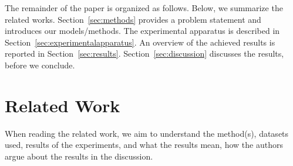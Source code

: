 \documentclass[sigconf, review, nonacm]{acmart}
\begin{document}
The remainder of the paper is organized as follows.
%
Below, we summarize the related works.
Section~\ref{sec:methods} provides a problem statement and introduces our models/methods.
The experimental apparatus is described in Section~\ref{sec:experimentalapparatus}.
An overview of the achieved results is reported in Section~\ref{sec:results}. 
Section~\ref{sec:discussion} discusses the results, before we conclude.



\section{Related Work}
\label{sec:relatedwork}

When reading the related work, we aim to understand the method(s), datasets used, results of the experiments, and what the results mean, \ie how the authors argue about the results in the discussion.
\end{document}
